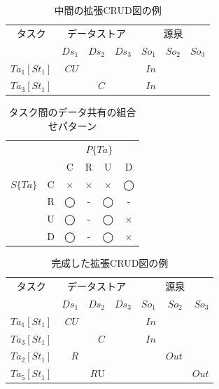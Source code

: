 \documentclass[a4paper,11pt]{jreport}
\begin{document}
\begin{table}[t]
  \centering
  \caption{中間の拡張CRUD図の例}
    \begin{tabular}{r|r|r|r|r|r|r}
    \multicolumn{1}{c|}{タスク} & \multicolumn{3}{c|}{データストア} & \multicolumn{3}{c}{源泉} \\
\cline{2-7}    \multicolumn{1}{c|}{} & $Ds_1$ & $Ds_2$ & $Ds_3$ & $So_1$ & $So_2$ & $So_3$ \\
    \hline
    \hline
    $Ta_1[St_1]$ & $CU$ &   &   & $In$ &   &  \\
    \hline
    $Ta_3[St_1]$ &   & $C$ &   & $In$ &   &  \\
    \hline
    \end{tabular}%
 \label{CRUDIO2}
\end{table}%

\begin{table}[h]
\caption{タスク間のデータ共有の組合せパターン}
\label{table:3}
\begin{center}
\begin{tabular}{c|c||c|c|c|c}
\hline
\multicolumn{2}{c||}{}& \multicolumn{4}{c}{$P\{Ta\}$}\\
\multicolumn{2}{c||}{}& C & R & U& D\\
\hline\hline
$S\{Ta\}$&C&×&×&×&◯\\
\cline{2-6}
&R&◯&-&◯& -\\
\cline{2-6}
&U&◯&-&◯&×\\
\cline{2-6}
&D&◯&- &◯&×\\
\hline
\end{tabular}
\end{center}
\end{table}

\begin{table}[t]
  \centering
  \caption{完成した拡張CRUD図の例}
    \begin{tabular}{r|r|r|r|r|r|r}
    \multicolumn{1}{c|}{タスク} & \multicolumn{3}{c|}{データストア} & \multicolumn{3}{c}{源泉} \\
\cline{2-7}    \multicolumn{1}{c|}{} & $Ds_1$ & $Ds_2$ & $Ds_3$ & $So_1$ & $So_2$ & $So_3$ \\
    \hline
    \hline
    $Ta_1[St_1]$ & $CU$ &   &   & $In$ &   &  \\
    \hline
    $Ta_3[St_1]$ &   & $C$ &   & $In$ &   &  \\
    \hline
    $Ta_2[St_1]$ & $R$ &   &   &   & $Out$ &  \\
    \hline
    $Ta_5[St_1]$ &   & $R$U &   &   &   & $Out$ \\
    \end{tabular}%
  \label{excrud}%
\end{table}%
\end{document}
